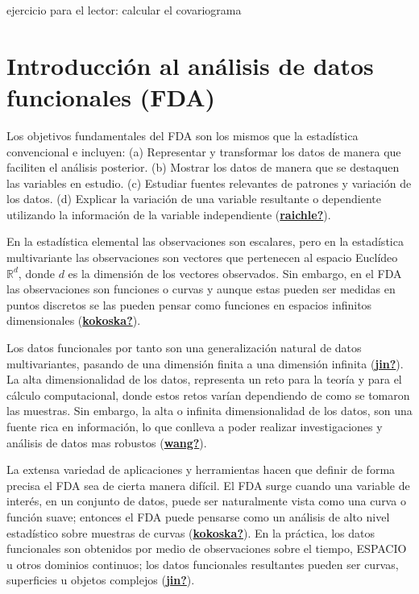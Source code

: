 \documentclass[
]{book}
\begin{document}
ejercicio para el lector: calcular el covariograma

\hypertarget{introducciuxf3n-al-anuxe1lisis-de-datos-funcionales-fda}{%
\chapter{Introducción al análisis de datos funcionales (FDA)}\label{introducciuxf3n-al-anuxe1lisis-de-datos-funcionales-fda}}

Los objetivos fundamentales del FDA son los mismos que la estadística convencional e incluyen: (a) Representar y transformar los datos de manera que faciliten el análisis posterior. (b) Mostrar los datos de manera que se destaquen las variables en estudio. (c) Estudiar fuentes relevantes de patrones y variación de los datos. (d) Explicar la variación de una variable resultante o dependiente utilizando la información de la variable independiente (\protect\hyperlink{ref-raichle}{\textbf{raichle?}}).

En la estadística elemental las observaciones son escalares, pero en la estadística multivariante las observaciones son vectores que pertenecen al espacio Euclídeo \(\mathbb{R}^d\), donde \(d\) es la dimensión de los vectores observados. Sin embargo, en el FDA las observaciones son funciones o curvas y aunque estas pueden ser medidas en puntos discretos se las pueden pensar como funciones en espacios infinitos dimensionales (\protect\hyperlink{ref-kokoska}{\textbf{kokoska?}}).

Los datos funcionales por tanto son una generalización natural de datos multivariantes, pasando de una dimensión finita a una dimensión infinita (\protect\hyperlink{ref-jin}{\textbf{jin?}}). La alta dimensionalidad de los datos, representa un reto para la teoría y para el cálculo computacional, donde estos retos varían dependiendo de como se tomaron las muestras. Sin embargo, la alta o infinita dimensionalidad de los datos, son una fuente rica en información, lo que conlleva a poder realizar investigaciones y análisis de datos mas robustos (\protect\hyperlink{ref-wang}{\textbf{wang?}}).

La extensa variedad de aplicaciones y herramientas hacen que definir de forma precisa el FDA sea de cierta manera difícil. El FDA surge cuando una variable de interés, en un conjunto de datos, puede ser naturalmente vista como una curva o función suave; entonces el FDA puede pensarse como un análisis de alto nivel estadístico sobre muestras de curvas (\protect\hyperlink{ref-kokoska}{\textbf{kokoska?}}). En la práctica, los datos funcionales son obtenidos por medio de observaciones sobre el tiempo, {ESPACIO} u otros dominios continuos; los datos funcionales resultantes pueden ser curvas, superficies u objetos complejos (\protect\hyperlink{ref-jin}{\textbf{jin?}}).
\end{document}
